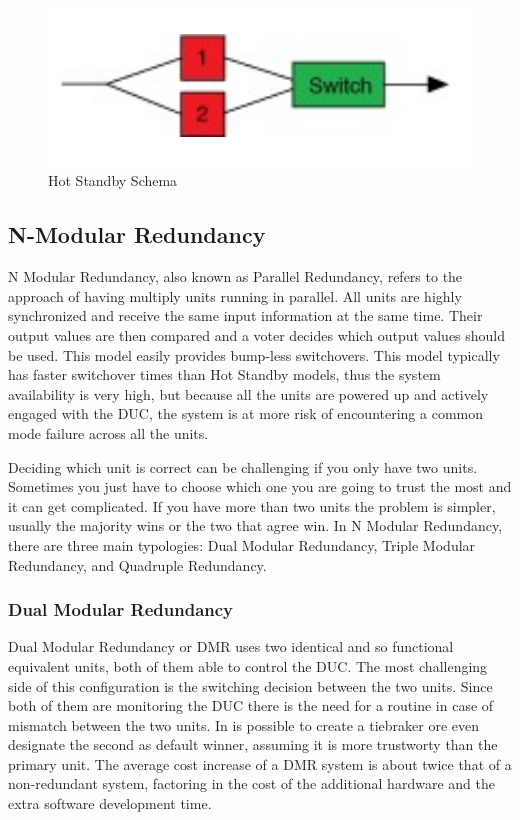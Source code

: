 \documentclass[./dissertation.tex]{subfiles}
\begin{document}
\begin{figure}[h!]
\centering
  \includegraphics[scale = 0.50]{imgs/hotred.png}
  \caption{Hot Standby Schema}
  \label{fig:hotred}
\end{figure}
\subsection{N-Modular Redundancy}
N Modular Redundancy, also known as Parallel Redundancy, refers to the approach of having multiply units running in parallel. All units are highly synchronized and receive the same input information at the same time. Their output values are then compared and a voter decides which output values should be used. This model easily provides bump-less switchovers.
This model typically has faster switchover times than Hot Standby models, thus the system availability is very high, but because all the units are powered up and actively engaged with the DUC, the system is at more risk of encountering a common mode failure across all the units.

Deciding which unit is correct can be challenging if you only have two units. Sometimes you just have to choose which one you are going to trust the most and it can get complicated. If you have more than two units the problem is simpler, usually the majority wins or the two that agree win. In N Modular Redundancy, there are three main typologies: Dual Modular Redundancy, Triple Modular Redundancy, and Quadruple Redundancy.


\subsubsection{Dual Modular Redundancy}
Dual Modular Redundancy or DMR uses two identical and so functional equivalent units, both of them able to control the DUC. The most challenging side of this configuration is the switching decision between the two units. Since both of them are monitoring the DUC there is the need for a routine in case of mismatch between the two units. In is possible to create a tiebraker ore even designate the second as default winner, assuming it is more trustworty than the primary unit. 
The average cost increase of a DMR system is about twice that of a non-redundant system, factoring in the cost of the additional hardware and the extra software development time.
\end{document}
